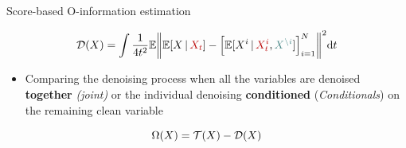 \documentclass{beamer}
\begin{document}


\begin{frame}{Score-based O-information estimation}



\begin{equation*}
\cD(X)  = \int \frac{1}{4t^2}\E\norm{\E[X\g {\color{myred} X_t }] - \left[ \E[X^i\g {\color{myred}X^i_t}, {\color{mygreen} X^{\setminus i} }] \right]_{i=1}^{N}}^2\dd t 
 \end{equation*}

\begin{itemize}
    \item Comparing the denoising process when all the variables are denoised \textbf{together} \textit{(joint)} or the individual denoising \textbf{conditioned} (\textit{Conditionals}) on the remaining clean variable 
\end{itemize}


\begin{equation*}
  \Omega(X)=\mathcal{T}(X)-\mathcal{D}(X)
\end{equation*}


\end{frame}

\end{document}
